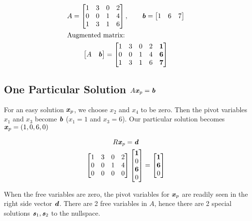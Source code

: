 \documentclass[12pt, letterpaper]{article}
\newcommand{\V}[1]{\textbf{\textit{#1}}}
\theoremstyle{definition}
\begin{document}
		\begin{gather*}
			A = \begin{bmatrix}
			1&3&0&2\\
			0&0&1&4\\
			1&3&1&6
			\end{bmatrix}, \qquad \V{b} = \begin{bmatrix} 1 & 6 & 7 \end{bmatrix} \\
		\intertext{Augmented matrix:}
			\begin{bmatrix} A & \V{b}\end{bmatrix} = \begin{bmatrix}
														1&3&0&2 & \textbf{1}\\
														0&0&1&4 & \textbf{6}\\
														1&3&1&6 & \textbf{7}
													\end{bmatrix}
		\end{gather*}
	
	
\subsection{One Particular Solution $A\V{x}_p = \V{b}$}
	For an easy solution $\V{x}_p$, we choose $x_2$ and $x_4$ to be zero. Then the pivot variables $x_1$ and $x_3$ become $\V{b}$ ($x_1=1$ and $x_3=6$). Our particular solution becomes $\V{x}_p = (1,0,6,0)$
	
		\begin{gather*}
			R\V{x}_p = \V{d} \\
			\begin{bmatrix}
					1&3&0&2\\
					0&0&1&4\\
					0&0&0&0
				\end{bmatrix} \begin{bmatrix}\textbf{1} \\
											  0 \\
											  \textbf{6} \\
											  0 \end{bmatrix} = \begin{bmatrix}
											  						\textbf{1} \\ \textbf{6} \\ 0
											  					\end{bmatrix}
		\end{gather*} 
	
	
	When the free variables are zero, the pivot variables for $\V{x}_p$ are readily seen in the right side vector $\V{d}$. There are 2 free variables in $A$, hence there are 2 special solutions $\V{s}_1, \V{s}_2$ to the nullspace.
	
\end{document}
